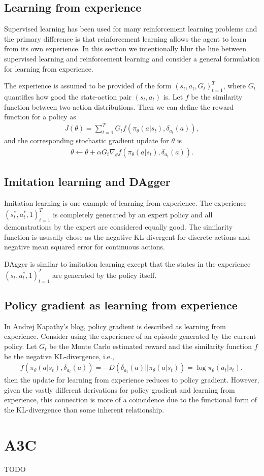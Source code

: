 \documentclass[onecolumn, 12pt]{IEEEtran}
\newcommand\1[1]{\mathbb{I}_{\left\{#1\right\}}}
\begin{document}
\subsection{Learning from experience}

Supervised learning has been used for many reinforcement learning problems and the primary difference is that reinforcement learning allows the agent to learn from its own experience. In this section we intentionally blur the line between supervised learning and reinforcement learning and consider a general formulation for learning from experience.

The experience is assumed to be provided of the form ${(s_t, a_t, G_t)}_{t = 1}^T$, where $G_t$ quantifies how good the state-action pair $(s_t, a_t)$ is. Let $f$ be the similarity function between two action distributions. Then we can define the reward function for a policy as
\begin{align*}
  J(\theta) = \sum_{t=1}^T{G_tf(\pi_\theta(a|s_t), \delta_{a_t}(a))}, 
\end{align*}
and the corresponding stochastic gradient update for $\theta$ is
\begin{align*}
  \theta \leftarrow \theta + \alpha G_t\nabla_\theta f(\pi_\theta(a|s_t), \delta_{a_t}(a)).
\end{align*}

\subsection{Imitation learning and DAgger}
Imitation learning is one example of learning from experience. The experience ${(s_t^*, a_t^*, 1)}_{t = 1}^T$ is completely generated by an expert policy and all demonstrations by the expert are considered equally good. The similarity function is ususally chose as the negative KL-divergent for discrete actions and negative mean squared error for continuous actions.

DAgger is similar to imitation learning except that the states in the experience ${(s_t, a_t^*, 1)}_{t = 1}^T$ are generated by the policy itself.

\subsection{Policy gradient as learning from experience}

In Andrej Kapathy's blog, policy gradient is described as learning from experience. Consider using the experience of an episode generated by the current policy. Let $G_t$ be the Monte Carlo estimated reward and the similarity function $f$ be the negative KL-divergence, i.e.,
\begin{align*}
  f(\pi_\theta(a|s_t), \delta_{a_t}(a)) = -D(\delta_{a_t}(a)||\pi_\theta(a|s_t)) = \log \pi_\theta(a_t|s_t),
\end{align*}
then the update for learning from experience reduces to policy gradient. However, given the vastly different derivations for policy gradient and learning from experience, this connection is more of a coincidence due to the functional form of the KL-divergence than some inherent relationship.


\section{A3C}
TODO
\end{document}
